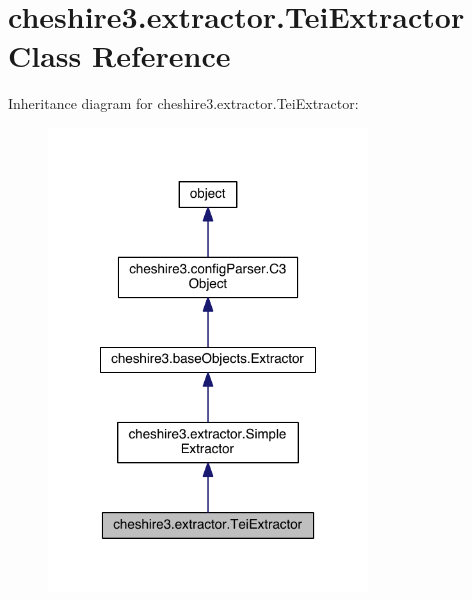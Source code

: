 \hypertarget{classcheshire3_1_1extractor_1_1_tei_extractor}{\section{cheshire3.\-extractor.\-Tei\-Extractor Class Reference}
\label{classcheshire3_1_1extractor_1_1_tei_extractor}
}


Inheritance diagram for cheshire3.\-extractor.\-Tei\-Extractor\-:
\nopagebreak
\begin{figure}[H]
\begin{center}
\leavevmode
\includegraphics[width=240pt]{classcheshire3_1_1extractor_1_1_tei_extractor__inherit__graph}
\end{center}
\end{figure}


